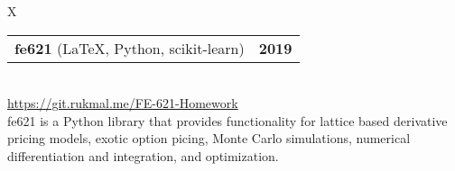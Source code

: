 \documentclass[10pt]{article}
\newcommand{\tabularxwidth}{\textwidth}
\begin{document}
        \begin{tabularx}{\tabularxwidth}{X}
                {
                    \begin{tabularx}{\tabularxwidth}{@{}X r}
                        \textbf{fe621}
                            (LaTeX, Python, scikit-learn)
                        &
                        \textbf{
        2019} \\
                    \end{tabularx}
                } \\

            

            

            
                \url{https://git.rukmal.me/FE-621-Homework} \\
            

            
    fe621 is a Python library that provides functionality for lattice based derivative pricing models, exotic option picing, Monte Carlo simulations, numerical differentiation and integration, and optimization. \\

        \end{tabularx}

        
            \vspace{.5em}
        

    
\end{document}
